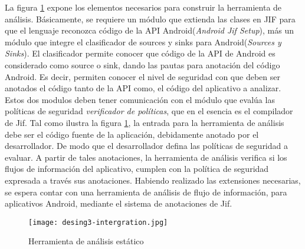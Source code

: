 La figura \ref{fig:desingInteger} expone los elementos necesarios para construir la
herramienta de análisis.
Básicamente, se requiere un módulo que extienda las clases en JIF para que el
lenguaje reconozca código de la API Android(\emph{Android Jif Setup}), más un
módulo que integre el clasificador de sources y sinks para Android(\emph{Sources
y Sinks}). El clasificador permite conocer que código de la API de Android es
considerado como source o sink, dando las pautas para anotación del código
Android. Es decir, permiten conocer el nivel de seguridad con que deben ser
anotados el código tanto de la API como, el código del aplicativo a analizar.
Estos dos modulos deben tener comunicación con el módulo que evalúa las
políticas de seguridad \emph{verificador de políticas}, que en el esencia es el
compilador de Jif.\newline
Tal como ilustra la figura \ref{fig:desingInteger}, la entrada para la herramienta de
análisis debe ser el código fuente de la aplicación, debidamente anotado por el
desarrollador. De modo que el desarrollador defina las políticas de seguridad a
evaluar. A partir de tales anotaciones, la herramienta de análisis verifica si
los flujos de información del aplicativo, cumplen con la política de seguridad
expresada a través sus anotaciones.
Habiendo realizado las extensiones necesarias, se espera contar con una
herramienta de análisis de flujo de información, para aplicativos Android,
mediante el sistema de anotaciones de Jif.
\begin{figure}[t!]
	\begin{center}
	\texttt{[image: desing3-intergration.jpg]}
	\end{center}
	\caption{Herramienta de análisis estático  }
	\label{fig:desingInteger}
\end{figure}


